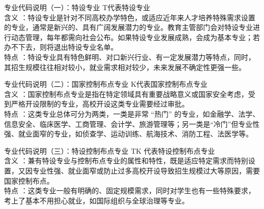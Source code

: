 \documentclass[aspectratio=169]{ctexbeamer} %
\begin{document}
\begin{frame}[t]{专业代码说明（一）：特设专业}
T代表特设专业\\

\vspace{1cm}
含义 ：特设专业是针对不同高校办学特色，或适应近年来人才培养特殊需求设置的专业，通常是新兴的、具有广阔发展潜力的专业。教育主管部门会对特设专业进行动态管理，每年都需向社会公布。如果特设专业\alert{发展成熟}，会\alert{成为基本专业}；若\alert{办不下去}，则将\alert{退出特设专业名单}。\\

\vspace{1cm}
特点 ：特设专业具有特色鲜明、对口新兴行业、有一定发展潜力等特点，同时，其招生规模往往相对较小，\alert{就业需求相对较少}，未来发展\alert{不确定性}更强一些。
\end{frame}

\begin{frame}[t]{专业代码说明（二）：国家控制布点专业}
K代表国家控制布点专业\\

\vspace{1cm}
含义 ：\alert{国家控制布点专业}是指在\alert{特定领域}具有重要\alert{战略意义}或\alert{国家安全}考虑，受到严格开设限制的专业，高校开设这类专业需要经过审批。\\

\vspace{1cm}
特点 ：这类专业总体可分为两类，一类是非常\alert{ “热门”} 的专业，如金融学、法学、信息安全、临床医学、工商管理、会计学、旅游管理等；另一类是\alert{“冷门”}但专业性强、就业面窄的专业，如侦查学、运动训练、航海技术、消防工程、法医学等。
\end{frame}

\begin{frame}[t]{专业代码说明（三）：特设控制布点专业}
TK 代表\alert{特设控制布点专业}\\

\vspace{1cm}
含义 ：兼有\alert{特设专业}与\alert{控制布点专业}的属性和特性，既是适应特定需求而特别设置，又因专业性强、就业面窄或防止过多高校开设导致招生规模过大等原因，需要国家控制布点。\\

\vspace{1cm}
特点 ：这类专业一般\alert{有明确的}、\alert{固定规模需求}，同时对学生也有一些\alert{特殊要求}，考上了基本不用担心就业，如国际组织与全球治理等专业。
\end{frame}
\end{document}
